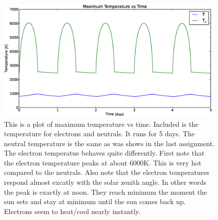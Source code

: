 \documentclass[10pt]{article}
\begin{document}
\begin{figure}[H]
	\centering
		\includegraphics[width=0.99\textwidth]{./figures/B/use/T_max_vs_time.eps}
	\caption{This is a plot of maximum temperature vs time. Included is the temperature for electrons and neutrals. It runs for 5 days. The neutral temperature is the same as was shows in the last assignment. The electron temperatue behaves quite differently. First note that the electron temperature peaks at about 6000K. This is very hot compared to the neutrals. Also note that the electron temperatures respond almost excatly with the solar zenith angle. In other words the peak is exactly at noon. They reach minimum the moment the sun sets and stay at minimum until the sun comes back up. Electrons seem to heat/cool nearly instantly.}
	\label{fig:Tmax}
\end{figure}
\end{document}
